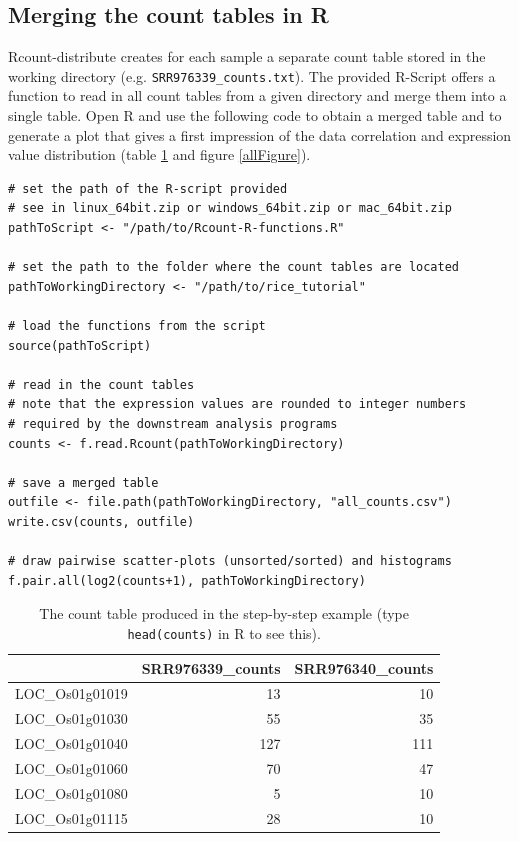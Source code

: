 \documentclass[a4paper,10pt]{article}
\begin{document}
\subsection{Merging the count tables in R}\label{R-usage}
Rcount-distribute creates for each sample a separate count table stored in the working directory (e.g. \texttt{SRR976339\_counts.txt}). The provided R-Script offers a function to read in all count tables from a given directory and merge them into a single table. Open R and use the following code to obtain a merged table and to generate a plot that gives a first impression of the data correlation and expression value distribution (table \ref{countTab} and figure \ref{allFigure}).
\begin{verbatim}
# set the path of the R-script provided
# see in linux_64bit.zip or windows_64bit.zip or mac_64bit.zip
pathToScript <- "/path/to/Rcount-R-functions.R"

# set the path to the folder where the count tables are located
pathToWorkingDirectory <- "/path/to/rice_tutorial"

# load the functions from the script
source(pathToScript)

# read in the count tables
# note that the expression values are rounded to integer numbers
# required by the downstream analysis programs
counts <- f.read.Rcount(pathToWorkingDirectory)

# save a merged table
outfile <- file.path(pathToWorkingDirectory, "all_counts.csv")
write.csv(counts, outfile)

# draw pairwise scatter-plots (unsorted/sorted) and histograms
f.pair.all(log2(counts+1), pathToWorkingDirectory)
\end{verbatim}
%
\begin{table}[!h]
\centering
\caption{The count table produced in the step-by-step example (type \texttt{head(counts)} in R to see this). }\label{countTab}
\vspace{8pt}
\begin{tabular}{l r r}
\hline
&SRR976339\_counts&SRR976340\_counts\\
\hline
LOC\_Os01g01019&13&10\\
LOC\_Os01g01030&55&35\\
LOC\_Os01g01040&127&111\\
LOC\_Os01g01060&70&47\\
LOC\_Os01g01080&5&10\\
LOC\_Os01g01115&28&10\\
\hline
\end{tabular}
\end{table}
\end{document}
